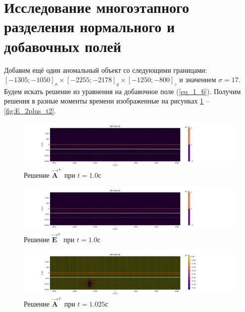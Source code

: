 \section{Исследование многоэтапного разделения нормального и добавочных полей}

Добавим ещё один аномальный объект со следующими границами: $[-1305; -1050]_x \times [-2255; -2178]_y \times [-1250; -800]_z$ и значением $\sigma = 17$. Будем искать решение из уравнения на добавочное поле (\ref{eq_1_6}). Получим решения в разные моменты времени изображенные на рисунках \ref{fig:A_2plus_t0} -- \ref{fig:E_2plus_t2}.

\begin{figure}
	\centering
	\includegraphics[width=1.0\linewidth]{images/Answer_A_2plus_time_layer_1.png}
	\caption{Решение $\overrightarrow{\textbf{A}}^+$ при $t = 1.0с$}
	\label{fig:A_2plus_t0}
\end{figure} 


\begin{figure}
	\centering
	\includegraphics[width=1.0\linewidth]{images/Answer_E_2plus_time_layer_1.png}
	\caption{Решение $\overrightarrow{\textbf{E}}^+$ при $t = 1.0с$}
	\label{fig:E_2plus_t0}
\end{figure} 


\begin{figure}
	\centering
	\includegraphics[width=1.0\linewidth]{images/Answer_A_2plus_time_layer_1.0250000000000006.png}
	\caption{Решение $\overrightarrow{\textbf{A}}^+$ при $t = 1.025с$}
	\label{fig:A_2plus_t1}
\end{figure} 



